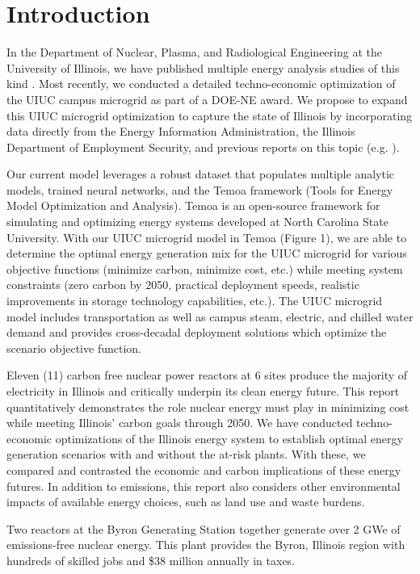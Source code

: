 \section{Introduction}
In the Department of Nuclear, Plasma, and Radiological Engineering at the 
University of Illinois, we have published multiple energy analysis studies of 
this kind \cite{stuff}. Most recently, we conducted a detailed techno-economic 
optimization of the UIUC campus microgrid as part of a DOE-NE award. We propose 
to expand this UIUC microgrid optimization to capture the state of Illinois by 
incorporating data directly from the Energy Information Administration, the 
Illinois Department of Employment Security, and previous reports on this topic 
(e.g. \cite{stuff}).

Our current model leverages a robust dataset that populates multiple analytic 
models, trained neural networks, and  the Temoa framework (Tools for Energy 
Model Optimization and Analysis)\cite{temoa}. Temoa is an open-source framework for 
simulating and optimizing energy systems developed at North Carolina State 
University. With our \gls{UIUC} microgrid model in 
Temoa (Figure 1), we are able to determine the optimal energy generation mix 
for the \gls{UIUC} microgrid for various objective functions (minimize carbon, 
minimize cost, etc.) while meeting system constraints (zero carbon by 2050, 
practical deployment speeds, realistic improvements in storage technology 
capabilities, etc.). The UIUC microgrid model includes transportation as well 
as campus steam, electric, and chilled water demand and provides cross-decadal 
deployment solutions which optimize the scenario objective function.



Eleven (11) carbon free nuclear power reactors at 6 sites produce the majority of
electricity in Illinois and critically underpin its clean energy future. This
report quantitatively demonstrates the role nuclear energy must play in
minimizing cost while meeting Illinois’ carbon goals
through 2050. We have conducted techno-economic optimizations of
the Illinois energy system to establish optimal energy generation scenarios with and without the
at-risk plants. With these, we compared and contrasted the economic and carbon implications of
these energy futures. In addition to emissions, this report also considers
other environmental impacts of available energy choices, such as land use and
waste burdens.

Two reactors at the Byron Generating Station together generate over 2 GWe of
emissions-free nuclear energy. This plant provides the Byron, Illinois region
with hundreds of skilled jobs and \$38 million annually in taxes.
